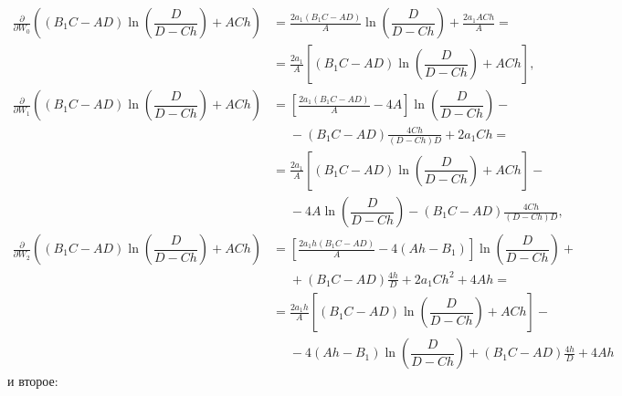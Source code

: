 \documentclass[a4paper,14pt]{article}
\begin{document}
\begin{equation*}
  \begin{aligned}
    \frac{\partial }{\partial W_0} \left(
    \left(B_1 C - A D \right)
    \ln \left( \dfrac{D}{D - C h} \right)
    + A C h
    \right)
    &=
      \frac{2 a_1 (B_1 C - AD)}{A}
      \ln \left( \dfrac{D}{D - C h} \right)
      + \frac{2 a_1 A C h}{A} = \\
    &=
      \frac{2 a_1}{A} \left[
      \left(B_1 C - A D \right)
      \ln \left( \dfrac{D}{D - C h} \right)
      + A C h
      \right],
    \\
    \frac{\partial }{\partial W_1} \left(
    \left(B_1 C - A D \right)
    \ln \left( \dfrac{D}{D - C h} \right)
    + A C h
    \right)
    &=
      \left[
      \frac{2 a_1 (B_1 C - A D)}{A} - 4 A
      \right]
      \ln \left( \dfrac{D}{D - C h} \right) - \\
    &\phantom{=}
      -
      \left(B_1 C - A D \right)
      \frac{4 C h}{(D - C h) D}
      +
      2 a_1 C h = \\
    &=
      \frac{2 a_1}{A} \left[
      \left(B_1 C - A D \right)
      \ln \left( \dfrac{D}{D - C h} \right)
      + A C h
      \right]
      - \\
    &\phantom{=}
      - 4 A \ln \left( \dfrac{D}{D - C h} \right)
      -
      \left(B_1 C - A D \right)
      \frac{4 C h}{(D - C h) D},
    \\
    \frac{\partial }{\partial W_2} \left(
    \left(B_1 C - A D \right)
    \ln \left( \dfrac{D}{D - C h} \right)
    + A C h
    \right)
    &=
      \left[
      \frac{2 a_1 h (B_1 C - A D)}{A} - 4 (A h - B_1)
      \right]
      \ln \left( \dfrac{D}{D - C h} \right)
      + \\
    &\phantom{=}
      + \left(B_1 C - A D \right) \frac{4 h}{D}
      + 2 a_1 C h^2 + 4 A h = \\
    &=
      \frac{2 a_1 h}{A} \left[
      \left(B_1 C - A D \right)
      \ln \left( \dfrac{D}{D - C h} \right)
      + A C h
      \right] - \\
    &\phantom{=}
      - 4 (A h - B_1) \ln \left( \dfrac{D}{D - C h} \right)
      + \left(B_1 C - A D \right) \frac{4 h}{D}
      + 4 A h
  \end{aligned}
\end{equation*}
и второе:
\end{document}
